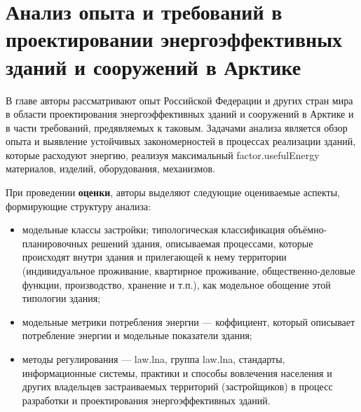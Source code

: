 \chapter{Анализ опыта и требований в проектировании энергоэффективных зданий и сооружений в Арктике}
В главе авторы рассматривают опыт Российской Федерации и других стран мира в области проектирования энергоэффективных зданий и сооружений в Арктике и в части требований, предявляемых к таковым.
Задачами анализа является обзор опыта и выявление устойчивых закономерностей в процессах реализации зданий, которые расходуют энергию, реализуя максимальный \gls{factor.usefulEnergy} материалов, изделий, оборудования, механизмов.

При проведении \textbf{оценки}, авторы выделяют следующие оцениваемые аспекты, формирующие структуру анализа:
\begin{itemize}
    \item модельные классы застройки; типологическая классификация объёмно-планировочных решений здания, описываемая процессами,
    которые происходят внутри здания и прилегающей к нему территории (индивидуальное проживание, квартирное проживание, общественно-деловые функции, производство, хранение и т.п.),
    как модельное обощение этой типологии здания;
    \item модельные метрики потребления энергии --- коффициент, который описывает потребление энергии и модельные показатели здания; %
    \item методы регулирования --- \gls{law.lna}, группа \gls{law.lna}, стандарты, информационные системы,
    практики и способы вовлечения населения и других владельцев застраиваемых территорий (застройщиков) в процесс разработки и проектирования энергоэффективных зданий.
\end{itemize}

\cite{law_RU_GradoCodex}

\providecommand{\scAssesmentHeader}[1]
{\textbf{Оценка опыта и требований в проектировании энергоэффективных зданий #1}}
\providecommand{\scAssesmentBuildingClass}{Модельные классы застройки}
\providecommand{\scAssesmentBuildingMetrics}{Модельные метрики потребления энергии}
\providecommand{\scAssesmentExp}{Опыт применения}
\providecommand{\scAssesmentBuildingLaw}{Методы регулирования}





